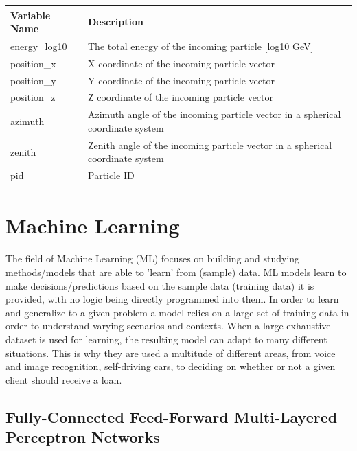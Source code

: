 \documentclass[a4paper,10pt]{scrartcl}
\begin{document}
\begin{center}
    \begin{tabular}{ |l|l| }
        \hline
        Variable Name & Description                                                                    \\
        \hline
        energy\_log10 & The total energy of the incoming particle [log10 GeV]                          \\
        position\_x   & X coordinate of the incoming particle vector                                   \\
        position\_y   & Y coordinate of the incoming particle vector                                   \\
        position\_z   & Z coordinate of the incoming particle vector                                   \\
        azimuth       & Azimuth angle of the incoming particle vector in a spherical coordinate system \\
        zenith        & Zenith angle of the incoming particle vector in a spherical coordinate system  \\
        pid           & Particle ID                                                                    \\
        \hline
    \end{tabular}
\end{center}

\section{Machine Learning}
\label{ml}

The field of Machine Learning (ML) focuses on building and studying methods/models that are able to 'learn' from (sample) data.
ML models learn to make decisions/predictions based on the sample data (training data) it is provided, with no logic being directly programmed into them.
In order to learn and generalize to a given problem a model relies on a large set of training data in order to understand varying scenarios and contexts.
When a large exhaustive dataset is used for learning, the resulting model can adapt to many different situations.
This is why they are used a multitude of different areas, from voice and image recognition, self-driving cars, to deciding on whether or not a given client should receive a loan.

\subsection{Fully-Connected Feed-Forward Multi-Layered Perceptron Networks}
\end{document}
